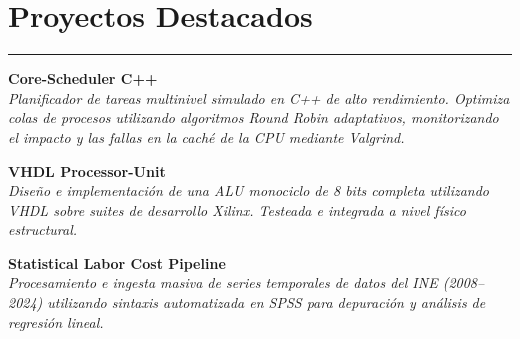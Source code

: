 \documentclass[11pt,a4paper]{article}
\begin{document}
\vspace{10pt}

\section*{Proyectos Destacados}
\hrule
\vspace{6pt}

\textbf{Core-Scheduler C++} \\
\textit{Planificador de tareas multinivel simulado en C++ de alto rendimiento. Optimiza colas de procesos utilizando algoritmos Round Robin adaptativos, monitorizando el impacto y las fallas en la caché de la CPU mediante Valgrind.}

\vspace{6pt}

\textbf{VHDL Processor-Unit} \\
\textit{Diseño e implementación de una ALU monociclo de 8 bits completa utilizando VHDL sobre suites de desarrollo Xilinx. Testeada e integrada a nivel físico estructural.}

\vspace{6pt}

\textbf{Statistical Labor Cost Pipeline} \\
\textit{Procesamiento e ingesta masiva de series temporales de datos del INE (2008--2024) utilizando sintaxis automatizada en SPSS para depuración y análisis de regresión lineal.}
\end{document}
